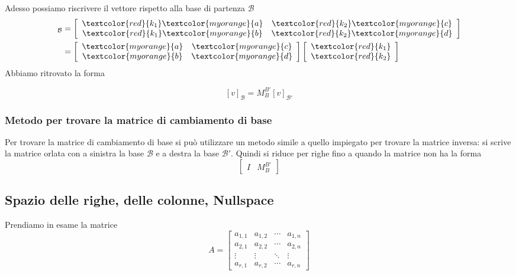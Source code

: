 \documentclass[x11names]{article}
\begin{document}
\begin{es}
	
Adesso possiamo riscrivere il vettore rispetto alla base di partenza $\mathcal{B}$
\begin{align*}
[v]_{\mathcal{B}} &= \left[\begin{array}{cc}
	\textcolor{red}{k_{1}}\textcolor{myorange}{a} & \textcolor{red}{k_{2}}\textcolor{myorange}{c} \\
	\textcolor{red}{k_{1}}\textcolor{myorange}{b} & \textcolor{red}{k_{2}}\textcolor{myorange}{d}
\end{array}\right] \\
	&=\left[\begin{array}{cc}
		\textcolor{myorange}{a} & \textcolor{myorange}{c} \\
		\textcolor{myorange}{b} &\textcolor{myorange}{d}
	\end{array}\right]
	\left[
	\begin{array}{c}
		\textcolor{red}{k_{1}}\\
		\textcolor{red}{k_{2}}
	\end{array}\right]
\end{align*}
Abbiamo ritrovato la forma

\[
[v]_{\mathcal{B}} =  M_{B}^{B'} [v]_{\mathcal{B}'}
\] 

\end{es}

\subsubsection{Metodo per trovare la matrice di cambiamento di base}
Per trovare la matrice di cambiamento di base si può utilizzare un metodo simile a quello impiegato per trovare la matrice inversa: si scrive la matrice orlata con a sinistra la base $\mathscr{B}$ e a destra la base $\mathscr{B}'$. Quindi si riduce per righe fino a quando la matrice non ha la forma
\[
	\left[\begin{array}{c|c}
			I & M_{B}^{B'}
	\end{array}\right]
\] 

\subsection{Spazio delle righe, delle colonne, Nullspace}
Prendiamo in esame la matrice
\[
A=
\begin{bmatrix}a_{1,1}&a_{1,2}&\cdots &a_{1,n}\\a_{2,1}&a_{2,2}&\cdots &a_{2,n}\\ \vdots &\vdots &\ddots &\vdots \\a_{r,1}&a_{r,2}&\cdots &a_{r,n}\end{bmatrix}
\] 
\end{document}
